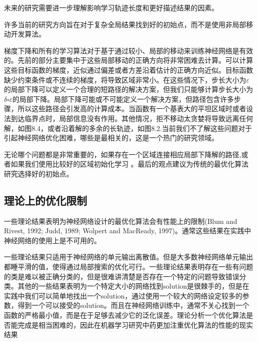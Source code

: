 未来的研究需要进一步理解影响学习轨迹长度和更好描述结果的因素。


许多当前的研究方向旨在对于复杂全局结果找到好的初始点，而不是使用非局部移动开发算法。

梯度下降和所有的学习算法对于基于通过较小、局部的移动来训练神经网络是有效的。先前的部分主要集中于这些局部移动的正确方向将非常困难去计算。可以计算这些目标函数的梯度，近似通过偏差或者方差沿着估计的正确方向近似。目标函数缺少约束条件或不连续的梯度，将导致区域非常小。在这些情况下，步长大小为$\varepsilon$的局部下降可以定义一个合理的短路径的解决方案，但我们只能够计算步长大小为$\delta\square\varepsilon$的局部下降。局部下降可能或不可能定义一个解决方案，但路径包含许多步骤，所以这些路径会引发高的计算成本。当函数有一个基表大的平坦区域时或者设法到达临界点时，局部信息没有作用。其他情况，拒不移动太贪婪将导致远离任何解，如图8.4，或者沿着解的多余的长轨迹，如图8.2.当前我们不了解这些问题对于引起神经网络优化困难，哪些是最相关的，这是一个热门的研究领域。

无论哪个问题都是非常重要的，如果存在一个区域连接相应局部下降解的路径,或者如果我们使用比较好的区域初始化学习 。最后的观点建议为传统的最优化算法研究选择好的初始点。

\subsection{理论上的优化限制}

一些理论结果表明为神经网络设计的最优化算法会有性能上的限制(Blum and Rivest,
1992; Judd, 1989; Wolpert and MacReady, 1997)。通常这些结果在实践中神经网络的使用上是不可用的。

一些理论结果只适用于神经网络的单元输出离散值。但是大多数神经网络单元输出都睡平滑的值，使得通过局部搜索的优化可行。一些理论结果表明存在一些有问题的类是难以被正确分类的，但是很难讲清楚是否存在一个特定的问题导致错误分类。其他的一些结果表明为一个特定大小的网络找到solution是很棘手的，但是在实践中我们可以简单地找出一个solution，通过使用一个较大的网络设定较多的参数，得到一个可以接受的solution。而且在神经网络训练中，通常不关心找到一个函数的严格最小值，而是在于足够去减少它的泛化误差。理论分析一个优化算法是否能完成是相当困难的，因此在机器学习研究中药更加注重优化算法的性能的现实结果














